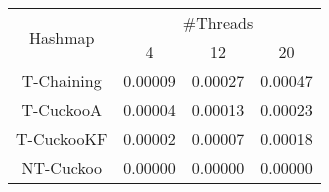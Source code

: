 \begin{tabular}{|c|c|c|c|}
\hline
\multirow{2}{*}{Hashmap} & \multicolumn{3}{c|}{\#Threads}\\\cline{2-4}& 4 & 12 & 20\\
\hline
\hline
T-Chaining & 0.00009 & 0.00027 & 0.00047\\
T-CuckooA & 0.00004 & 0.00013 & 0.00023\\
T-CuckooKF & 0.00002 & 0.00007 & 0.00018\\
NT-Cuckoo & 0.00000 & 0.00000 & 0.00000\\
\hline
\end{tabular}
